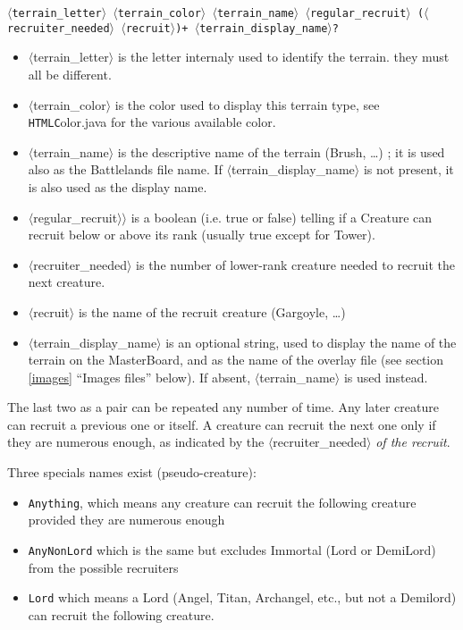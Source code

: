 \documentclass{article}
\begin{document}
\texttt{$\langle$terrain\_letter$\rangle$ $\langle$terrain\_color$\rangle$ $\langle$terrain\_name$\rangle$ $\langle$regular\_recruit$\rangle$ ($\langle$recruiter\_needed$\rangle$ $\langle$recruit$\rangle$)+ $\langle$terrain\_display\_name$\rangle$?}

\begin{itemize}
\item $\langle$terrain\_letter$\rangle$ is the letter internaly used to identify the terrain. they must all be different.
\item $\langle$terrain\_color$\rangle$ is the color used to display this terrain type, see \texttt{HTMLC}olor.java for the various available color.
\item $\langle$terrain\_name$\rangle$ is the descriptive name of the terrain (Brush, \ldots) ; it is used also as the Battlelands file name. If $\langle$terrain\_display\_name$\rangle$ is not present, it is also used as the display name.
\item $\langle$regular\_recruit$\rangle$$\rangle$ is a boolean (i.e. true or false) telling if a Creature can recruit below or above its rank (usually true except for Tower).
\item $\langle$recruiter\_needed$\rangle$ is the number of lower-rank creature needed to recruit the next creature.
\item $\langle$recruit$\rangle$ is the name of the recruit creature (Gargoyle, \ldots)
\item $\langle$terrain\_display\_name$\rangle$ is an optional string, used to display the name of the terrain on the MasterBoard, and as the name of the overlay file (see section \ref{images} ``Images files'' below). If absent, $\langle$terrain\_name$\rangle$ is used instead.
\end{itemize}

The last two as a pair can be repeated any number of time. Any later creature can recruit a previous one or itself. A creature can recruit the next one only if they are numerous enough, as indicated by the $\langle$recruiter\_needed$\rangle$ \emph{of the recruit}.

Three specials names exist (pseudo-creature):
\begin{itemize}
\item \texttt{Anything}, which means any creature can recruit the following creature provided they are numerous enough
\item \texttt{AnyNonLord} which is the same but excludes Immortal (Lord or DemiLord) from the possible recruiters
\item \texttt{Lord} which means a Lord (Angel, Titan, Archangel, etc., but not a Demilord) can recruit the following creature.
\end{itemize}
\end{document}
